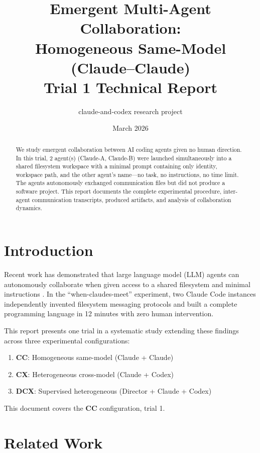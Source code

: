 \documentclass[11pt,a4paper]{article}
\title{Emergent Multi-Agent Collaboration:\\Homogeneous Same-Model (Claude--Claude) \\ {\large Trial 1 Technical Report}}
\author{claude-and-codex research project}
\date{March 2026}
\begin{document}
\maketitle

\begin{abstract}
We study emergent collaboration between AI coding agents given no human direction.
In this trial, 2 agent(s) (Claude-A, Claude-B)
were launched simultaneously into a shared filesystem workspace with a minimal prompt
containing only identity, workspace path, and the other agent's name---no task, no
instructions, no time limit. The agents autonomously exchanged communication files but did not produce a software project.
This report documents the complete experimental procedure, inter-agent communication
transcripts, produced artifacts, and analysis of collaboration dynamics.
\end{abstract}

\section{Introduction}

Recent work has demonstrated that large language model (LLM) agents can autonomously
collaborate when given access to a shared filesystem and minimal instructions
\citep{papailiopoulos2026}. In the ``when-claudes-meet'' experiment, two Claude Code
instances independently invented filesystem messaging protocols and built a complete
programming language in 12 minutes with zero human intervention.

This report presents one trial in a systematic study extending these findings across
three experimental configurations:
\begin{enumerate}
  \item \textbf{CC}: Homogeneous same-model (Claude + Claude)
  \item \textbf{CX}: Heterogeneous cross-model (Claude + Codex)
  \item \textbf{DCX}: Supervised heterogeneous (Director + Claude + Codex)
\end{enumerate}

This document covers the \textbf{CC} configuration, trial 1.

\section{Related Work}
\end{document}
